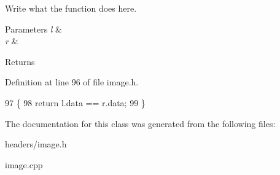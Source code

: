 Write what the function does here. 


\begin{DoxyParams}{Parameters}
{\em l} & \\
\hline
{\em r} & \\
\hline
\end{DoxyParams}
\begin{DoxyReturn}{Returns}

\end{DoxyReturn}


Definition at line 96 of file image.\+h.


\begin{DoxyCode}
97         \{
98             \textcolor{keywordflow}{return} l.data == r.data;
99         \}
\end{DoxyCode}


The documentation for this class was generated from the following files\+:\begin{DoxyCompactItemize}
\item 
headers/image.\+h\item 
image.\+cpp\end{DoxyCompactItemize}
